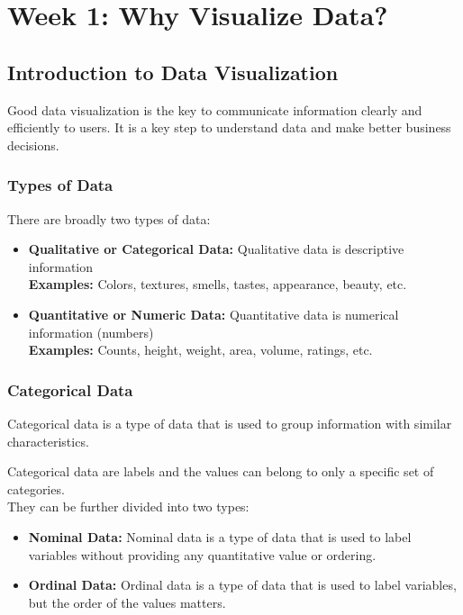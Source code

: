 \documentclass[11pt,fleqn]{book} %
\begin{document}

\pagestyle{fancy} %


\chapter{Week 1: Why Visualize Data?}
\section{Introduction to Data Visualization}
Good data visualization is the key to communicate information clearly and efficiently to users. It is a key step to understand data and make better business decisions.\\
\subsection{Types of Data}
There are broadly two types of data:
\begin{itemize}
\item \textbf{Qualitative or Categorical Data:} Qualitative data is descriptive information \\
\textbf{Examples:} Colors, textures, smells, tastes, appearance, beauty, etc.
\item \textbf{Quantitative or Numeric Data:} Quantitative data is numerical information (numbers)\\
\textbf{Examples:} Counts, height, weight, area, volume, ratings, etc.
\end{itemize}
\subsection{Categorical Data}
\begin{definition}
Categorical data is a type of data that is used to group information with similar characteristics.
\end{definition}
Categorical data are labels and the values can belong to only
a specific set of categories.\\

They can be further divided into two types:
\begin{itemize}
\item \textbf{Nominal Data:} Nominal data is a type of data that is used to label variables without providing any quantitative value or ordering.\\
\item \textbf{Ordinal Data:} Ordinal data is a type of data that is used to label variables, but the order of the values matters.\\
\end{itemize}
\end{document}
